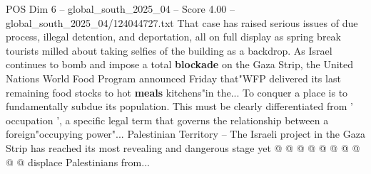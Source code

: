 \begin{textsample}{POS Dim 6 – global\_south\_2025\_04 – Score 4.00 – global\_south\_2025\_04/124044727.txt}
That case has raised serious issues of due process, illegal detention, and deportation, all on full display as spring break tourists milled about taking selfies of the building as a backdrop.
As Israel continues to bomb and impose a total \textbf{blockade} on the Gaza Strip, the United Nations World Food Program announced Friday that"WFP delivered its last remaining food stocks to hot \textbf{meals} kitchens"in the...
To conquer a place is to fundamentally subdue its population.
This must be clearly differentiated from ' occupation ', a specific legal term that governs the relationship between a foreign"occupying power"...
Palestinian Territory -- The Israeli project in the Gaza Strip has reached its most revealing and dangerous stage yet @ @ @ @ @ @ @ @ @ @ displace Palestinians from...

\end{textsample}
